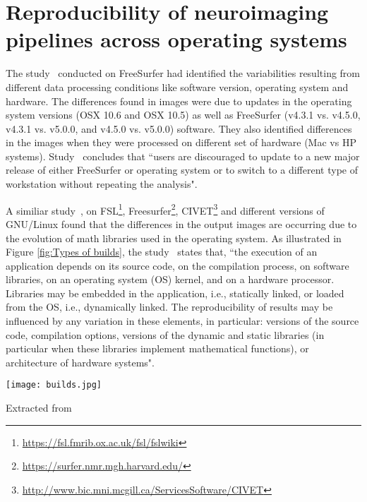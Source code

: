 \section{Reproducibility of neuroimaging pipelines across operating systems}

The study~\cite{10.1371/journal.pone.0038234} conducted on FreeSurfer had identified the variabilities resulting from different data processing conditions like software version, operating system and hardware. The differences found in images were due to updates in the operating system versions (OSX 10.6 and OSX 10.5) as well as FreeSurfer (v4.3.1 vs. v4.5.0, v4.3.1 vs. v5.0.0, and v4.5.0 vs. v5.0.0) software. They also identified differences in the images when they were processed on different set of hardware (Mac vs HP systems). Study~\cite{10.1371/journal.pone.0038234} concludes that ``users are discouraged to update to a new major release of either FreeSurfer or operating system or to switch to a different type of workstation without repeating the analysis".

A similiar study~\cite{Gla15}, on FSL\footnote{\url{https://fsl.fmrib.ox.ac.uk/fsl/fslwiki}}, Freesurfer\footnote{\url{https://surfer.nmr.mgh.harvard.edu/}}, CIVET\footnote{\url{http://www.bic.mni.mcgill.ca/ServicesSoftware/CIVET}} and different versions of GNU/Linux found that the differences in the output images are occurring due to the evolution of math libraries used in the operating system. As illustrated in Figure \ref{fig:Types of builds}, the study~\cite{Gla15} states that, ``the execution of an application depends on its source code, on the compilation process, on software libraries, on an operating system (OS) kernel, and on a hardware processor. Libraries may be embedded in the application, i.e., statically linked, or loaded from the OS, i.e., dynamically linked. The reproducibility of results may be influenced by any variation in these elements, in particular: versions of the source code, compilation options, versions of the dynamic and static libraries (in particular when these libraries implement mathematical functions), or architecture of hardware systems".

\begin{center}
\texttt{[image: builds.jpg]}
\label{fig:Types of builds}
\caption*{Extracted from \cite{Gla15}}
\end{center}

